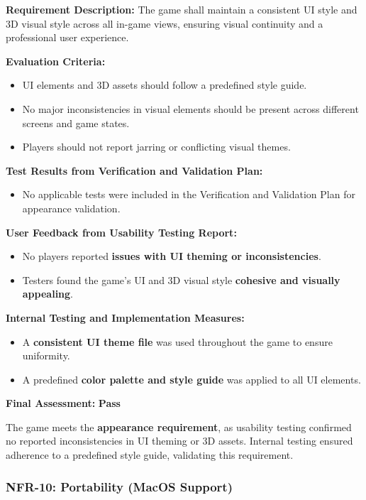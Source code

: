 \documentclass[12pt, titlepage]{article}
\begin{document}
\textbf{Requirement Description:}  
The game shall maintain a consistent UI style and 3D visual style across all in-game views, ensuring visual continuity and a professional user experience.

\textbf{Evaluation Criteria:}  
\begin{itemize}
    \item UI elements and 3D assets should follow a predefined style guide.
    \item No major inconsistencies in visual elements should be present across different screens and game states.
    \item Players should not report jarring or conflicting visual themes.
\end{itemize}

\textbf{Test Results from Verification and Validation Plan:}  
\begin{itemize}
    \item No applicable tests were included in the Verification and Validation Plan for appearance validation.
\end{itemize}

\textbf{User Feedback from Usability Testing Report:}  
\begin{itemize}
    \item No players reported \textbf{issues with UI theming or inconsistencies}.
    \item Testers found the game’s UI and 3D visual style \textbf{cohesive and visually appealing}.
\end{itemize}

\textbf{Internal Testing and Implementation Measures:}  
\begin{itemize}
    \item A \textbf{consistent UI theme file} was used throughout the game to ensure uniformity.
    \item A predefined \textbf{color palette and style guide} was applied to all UI elements.
\end{itemize}

\textbf{Final Assessment:} \textbf{Pass}  

The game meets the \textbf{appearance requirement}, as usability testing confirmed no reported inconsistencies in UI theming or 3D assets. Internal testing ensured adherence to a predefined style guide, validating this requirement.


\subsubsection{NFR-10: Portability (MacOS Support)}
\label{NFR10}
\end{document}
